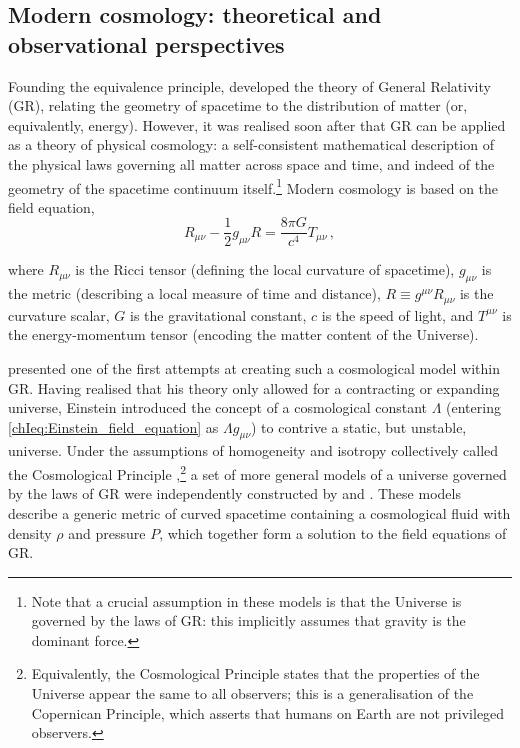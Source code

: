 \subsection{Modern cosmology: theoretical and observational perspectives}
\label{chIssec:Modern_cosmology}

Founding the equivalence principle, \citet{1915SPAW.......844E} developed the theory of General Relativity (GR), relating the geometry of spacetime to the distribution of matter (or, equivalently, energy). However, it was realised soon after that GR can be applied as a theory of physical cosmology: a self-consistent mathematical description of the physical laws governing all matter across space and time, and indeed of the geometry of the spacetime continuum itself.\footnote{Note that a crucial assumption in these models is that the Universe is governed by the laws of GR: this implicitly assumes that gravity is the dominant force.} Modern cosmology is based on the \citeauthor{1915SPAW.......844E} field equation,
\begin{equation}
    \label{chIeq:Einstein_field_equation}
    R_{\mu \nu} - \frac{1}{2} g_{\mu \nu} R = \frac{8 \pi G}{c^4} T_{\mu \nu} \, ,
\end{equation}

\noindent where $R_{\mu \nu}$ is the Ricci tensor (defining the local curvature of spacetime), $g_{\mu \nu}$ is the metric (describing a local measure of time and distance), $R \equiv g^{\mu \nu} R_{\mu \nu}$ is the curvature scalar, $G$ is the gravitational constant, $c$ is the speed of light, and $T^{\mu \nu}$ is the energy-momentum tensor (encoding the matter content of the Universe).

\citet{1917SPAW.......142E} presented one of the first attempts at creating such a cosmological model within GR. Having realised that his theory only allowed for a contracting or expanding universe, Einstein introduced the concept of a cosmological constant $\Lambda$ (entering \cref{chIeq:Einstein_field_equation} as $\Lambda g_{\mu \nu}$) to contrive a static, but unstable, universe. Under the assumptions of homogeneity and isotropy collectively called the Cosmological Principle \citep{1933ZA......6....1M},\footnote{Equivalently, the Cosmological Principle states that the properties of the Universe appear the same to all observers; this is a generalisation of the Copernican Principle, which asserts that humans on Earth are not privileged observers.} a set of more general models of a universe governed by the laws of GR were independently constructed by \citet{1922ZPhy...10..377F} and \citet{1927PhDT.........6L}. These models describe a generic metric of curved spacetime containing a cosmological fluid with density $\rho$ and pressure $P$, which together form a solution to the field equations of GR.

